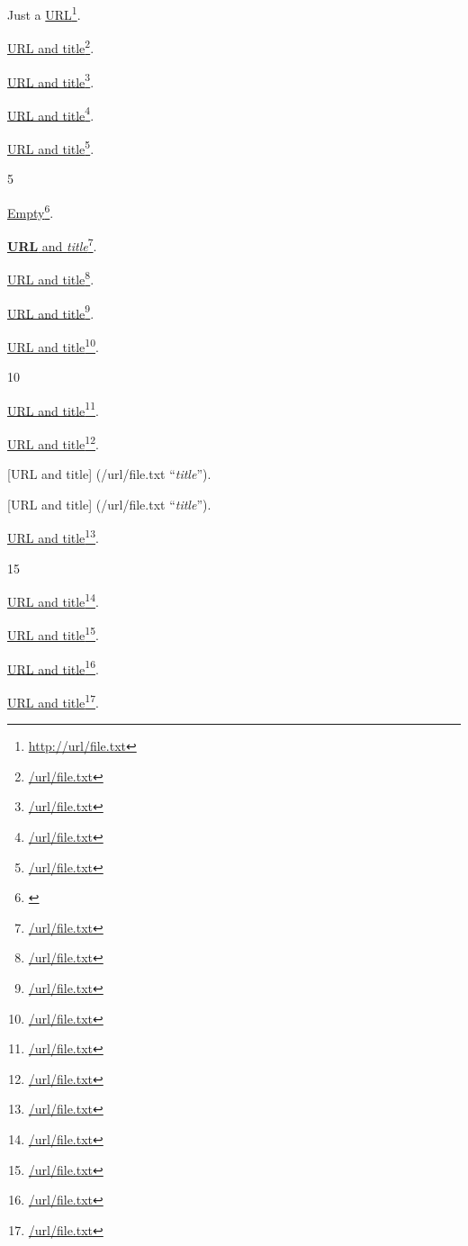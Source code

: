 
\def\mytitle{Inline Links}


Just a \href{http://url/file.txt}{URL}\footnote{\href{http://url/file.txt}{http:\slash \slash url\slash file.txt}}.

\href{/url/file.txt}{URL and title}\footnote{\href{/url/file.txt}{\slash url\slash file.txt}}.

\href{/url/file.txt}{URL and title}\footnote{\href{/url/file.txt}{\slash url\slash file.txt}}.

\href{/url/file.txt}{URL and title}\footnote{\href{/url/file.txt}{\slash url\slash file.txt}}.

\href{/url/file.txt}{URL and title}\footnote{\href{/url/file.txt}{\slash url\slash file.txt}}.

5

\href{}{Empty}\footnote{\href{}{}}.

\href{/url/file.txt}{\textbf{URL} and \emph{title}}\footnote{\href{/url/file.txt}{\slash url\slash file.txt}}.

\href{/url/file.txt}{URL and title}\footnote{\href{/url/file.txt}{\slash url\slash file.txt}}.

\href{/url/file.txt}{URL and title}\footnote{\href{/url/file.txt}{\slash url\slash file.txt}}.

\href{/url/file.txt}{URL and title}\footnote{\href{/url/file.txt}{\slash url\slash file.txt}}.

10

\href{/url/file.txt}{URL and title}\footnote{\href{/url/file.txt}{\slash url\slash file.txt}}.

\href{/url/file.txt}{URL and title}\footnote{\href{/url/file.txt}{\slash url\slash file.txt}}.

{[URL and title]} (\slash url\slash file.txt ``\emph{title}'').

{[URL and title]}
(\slash url\slash file.txt ``\emph{title}'').

\href{/url/file.txt}{URL and title}\footnote{\href{/url/file.txt}{\slash url\slash file.txt}}.

15

\href{/url/file.txt}{URL and title}\footnote{\href{/url/file.txt}{\slash url\slash file.txt}}.

\href{/url/file.txt}{URL and title}\footnote{\href{/url/file.txt}{\slash url\slash file.txt}}.

\href{/url/file.txt}{URL and title}\footnote{\href{/url/file.txt}{\slash url\slash file.txt}}.

\href{/url/file.txt}{URL and title}\footnote{\href{/url/file.txt}{\slash url\slash file.txt}}.




